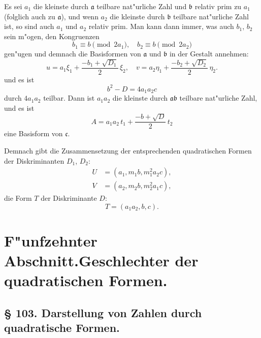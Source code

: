 \documentclass[12pt,a4paper]{article}
\theoremstyle{plain}
\begin{document}
Es sei $a_1$ die kleinste durch $\mathfrak{a}$ teilbare nat"urliche Zahl und $\mathfrak{b}$ relativ prim zu $a_1$ (folglich auch zu $\mathfrak{a}$), und wenn $a_2$ die kleinste durch $\mathfrak{b}$ teilbare nat"urliche Zahl ist, so sind auch $a_1$ und $a_2$ relativ prim. Man kann dann immer, was auch $b_1$, $b_2$ sein m"ogen, den Kongruenzen
\[
b_1 \equiv b \pmod{2a_1},\quad b_2 \equiv b \pmod{2a_2}
\]
gen"ugen und demnach die Basisformen von $\mathfrak{a}$ und $\mathfrak{b}$ in der Gestalt annehmen:
\[
u = a_1\xi_1 + \frac{-b_1 + \sqrt{D_1}}{2}\,\xi_2,\quad v = a_2\eta_1 + \frac{-b_2 + \sqrt{D_2}}{2}\,\eta_2.
\]
und es ist
\[
b^2 - D = 4a_1 a_2 c
\]
durch $4a_1 a_2$ teilbar. Dann ist $a_1 a_2$ die kleinste durch $\mathfrak{a}\mathfrak{b}$ teilbare nat"urliche Zahl, und es ist
\[
A = a_1 a_2\,t_1 + \frac{-b + \sqrt{D}}{2}\,t_2
\]
eine Basisform von $\mathfrak{c}$.

Demnach gibt die Zusammensetzung der entsprechenden quadratischen Formen der Diskriminanten $D_1$, $D_2$:
\begin{equation}
\begin{aligned}
U &= (a_1, m_1 b, m_1^2 a_2 c),\\
V &= (a_2, m_2 b, m_2^2 a_1 c),
\end{aligned}
\tag{5}
\end{equation}
die Form $T$ der Diskriminante $D$:
\begin{equation}
T = (a_1 a_2, b, c).
\tag{6}
\end{equation}

\newpage
\section*{F"unfzehnter Abschnitt.\quad Geschlechter der quadratischen Formen.}

\subsection*{\S{} 103. Darstellung von Zahlen durch quadratische Formen.}
\end{document}
